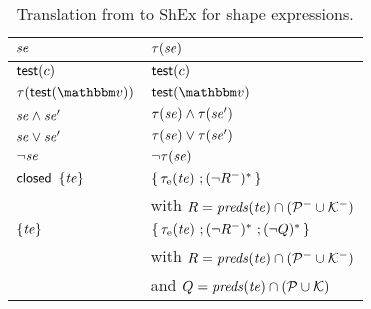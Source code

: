 \begin{table}[ht]
\caption{\label{tab:app-shex-translation-from-standard}%
  Translation from \stshex to ShEx for shape expressions.}
\centering
\begin{tabular}{ll}
\toprule
  $\mathit{se}$                         & $\tau(\mathit{se})$ \\
\midrule
  $\mathsf{test}(c)$              & $\mathsf{test}(c)$ \\
  $\trfromst{\shextest(\vtype)}$  & $\shextest(\vtype)$ \\
  $\mathit{se} \land \mathit{se}'$            & $\tau(\mathit{se}) \land
                                    \tau(\mathit{se}')$ \\
  $\mathit{se} \lor \mathit{se}'$             & $\tau(\mathit{se}) \lor \tau(\mathit{se}')$\\
  $\neg \mathit{se}$                    & $\neg \tau(\mathit{se})$ \\
  $\stclosed\ \shexneigh{\stte}$  & $\left\{ \,\tau_{\text{e}}(\mathit{te})
                                    \,\mathop{;}\, ({\neg{R^{-}}})^{*}\, \right\}$ \\
                                  & \qquad with $R = \mathit{preds}(\mathit{te}) \cap
                                    (\mathcal{P}^{-} \cup \mathcal{K}^{-})$ \\
  $\left\{ \mathit{te} \right\}$             & $\left\{ \,\tau_{\text{e}}(\mathit{te})
                                    \,\mathop{;}\, ({\neg{R^{-}}})^{*}
                                    \,\mathop{;}\, (\neg Q)^{*}\, \right\}$ \\
                                  & \qquad with $R = \mathit{preds}(\mathit{te}) \cap
                                    (\mathcal{P}^{-} \cup \mathcal{K}^{-})$ \\
                                  & \qquad and $Q = \mathit{preds}(\mathit{te}) \cap
                                    (\mathcal{P} \cup \mathcal{K})$ \\
\bottomrule
\end{tabular}
\end{table}


